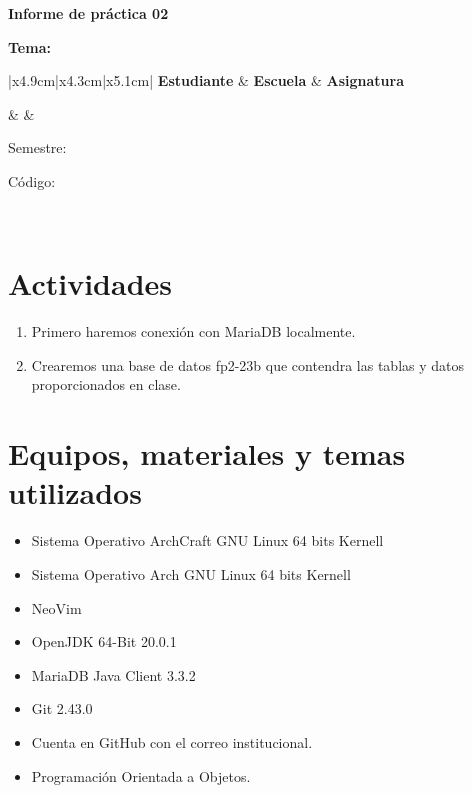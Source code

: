 
	
	\vspace*{10pt}
	
	\begin{center}	
		\fontsize{17}{17} \textbf{ Informe de práctica 02}
	\end{center}
	\centerline{\textbf{\Large Tema: \itemTheme}}
	\vspace*{0.5cm}	

	\begin{table}[H]
		\begin{tabular}{|x{4.9cm}|x{4.3cm}|x{5.1cm}|}
			\hline 
			\color{white} \textbf{Estudiante} & \color{white}\textbf{Escuela}  & \color{white}\textbf{Asignatura}   \\
			\hline 
			{\itemStudent \par \itemEmail} & \itemSchool & {\itemCourse \par Semestre: \itemSemester \par Código: \itemCourseCode}     \\
			\hline 			
		\end{tabular}
	\end{table}		
	
	\section{Actividades}
\begin{enumerate}
    \item Primero haremos conexión con MariaDB localmente.
    \item Crearemos una base de datos fp2-23b que contendra las tablas y datos proporcionados en clase.
\end{enumerate}
		
	\section{Equipos, materiales y temas utilizados}
	\begin{itemize}
		\item Sistema Operativo ArchCraft GNU Linux 64 bits Kernell
		\item Sistema Operativo Arch GNU Linux 64 bits Kernell
		\item NeoVim
		\item OpenJDK 64-Bit 20.0.1 
		\item MariaDB Java Client 3.3.2
		\item Git 2.43.0
		\item Cuenta en GitHub con el correo institucional.
		\item Programación Orientada a Objetos.
	\end{itemize}
